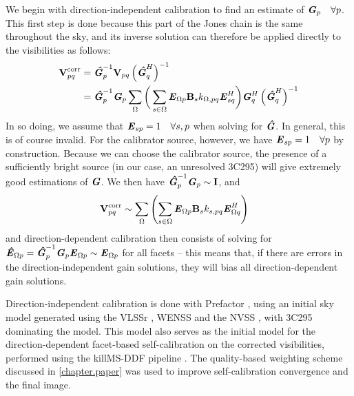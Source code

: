 \pg
We begin with direction-independent calibration to find an estimate of $\textbf{\emph{G}}_p\quad\forall p$. This first step is done because this part of the Jones chain is the same throughout the sky, and its inverse solution can therefore be applied directly to the visibilities as follows:
\begin{align}
\textbf{V}_{pq}^\mathrm{corr} &= \textbf{\emph{\^{G}}}_p^{-1} \textbf{V}_{pq} \left( \textbf{\emph{\^{G}}}_q^H \right)^{-1}\\
						&= \textbf{\emph{\^{G}}}_p^{-1}\textbf{\emph{G}}_p \sum_{\Omega}\bigg( \sum_{s\in\Omega} \textbf{\emph{E}}_{\Omega p} \textbf{B}_{s} k_{\Omega,pq} \textbf{\emph{E}}_{sq}^H \bigg) \textbf{\emph{G}}_q^H \left( \textbf{\emph{\^{G}}}_q^H \right)^{-1}
\end{align}
In so doing, we assume that $\textbf{\emph{E}}_{sp}=1\quad \forall s,p$ when solving for $\textbf{\emph{\^{G}}}$. In general, this is of course invalid. For the calibrator source, however, we have $\textbf{\emph{E}}_{sp} =1 \quad\forall p$ by construction. Because we can choose the calibrator source, the presence of a sufficiently bright source (in our case, an unresolved 3C295) will give extremely good estimations of $\textbf{\emph{G}}$. We then have $\textbf{\emph{\^{G}}}_p^{-1}\textbf{\emph{G}}_p\sim \bm{\mathrm{I}}$, and
\begin{align}
\textbf{V}_{pq}^\mathrm{corr} &\sim \sum_{\Omega}\left( \sum_{s\in\Omega} \textbf{\emph{E}}_{\Omega p} \textbf{B}_{s} k_{s,pq} \textbf{\emph{E}}_{\Omega q}^H \right)\label{eq.vcorr}
\end{align}
and direction-dependent calibration then consists of solving for $\textbf{\emph{\^{E}}}_{\Omega p} = \textbf{\emph{\^{G}}}_p^{-1}\textbf{\emph{G}}_p\textbf{\emph{E}}_{\Omega p} \sim \textbf{\emph{E}}_{\Omega p}$ for all facets -- this means that, if there are errors in the direction-independent gain solutions, they will bias all direction-dependent gain solutions.

\pg
Direction-independent calibration is done with Prefactor , using an initial sky model generated using the VLSSr , WENSS  and the NVSS , with 3C295 dominating the model. This model also serves as the initial model for the direction-dependent facet-based self-calibration on the corrected visibilities, performed using the killMS-DDF pipeline . The quality-based weighting scheme discussed in \cref{chapter.paper} was used to improve self-calibration convergence and the final image.

